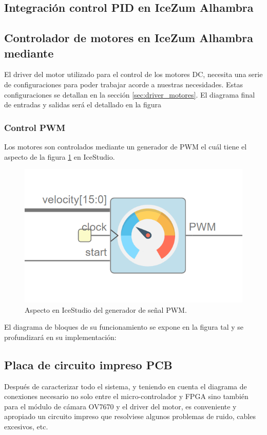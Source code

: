 \subsection{Integración control PID en IceZum Alhambra}

\subsection{Controlador de motores en IceZum Alhambra mediante}
El driver del motor utilizado para el control de los motores DC, necesita una serie de configuraciones para poder trabajar acorde a nuestras necesidades. Estas configuraciones se detallan en la sección \ref{sec:driver_motores}. El diagrama final de entradas y salidas será el detallado en la figura 


\subsubsection{Control PWM}

Los motores son controlados mediante un generador de PWM el cuál tiene el aspecto de la figura \ref{fig:pwm_module} en IceStudio. 

	\begin{figure}[H]
	\center
	\includegraphics[scale=0.5]{imagenes/Balancing_robot/PWM_module.PNG}
	\caption{Aspecto en IceStudio del generador de señal PWM.}
	\label{fig:pwm_module}
\end{figure}

El diagrama de bloques de su funcionamiento se expone en la figura tal y se profundizará en su implementación:



\subsection{Placa de circuito impreso PCB}\label{sec:DisenoPCB} 
Después de caracterizar todo el sistema, y teniendo en cuenta el diagrama de conexiones necesario no solo entre el micro-controlador y FPGA sino también para el módulo de cámara OV7670 y el driver del motor, es conveniente y apropiado un circuito impreso que resolviese algunos problemas de ruido, cables excesivos, etc. \newline

